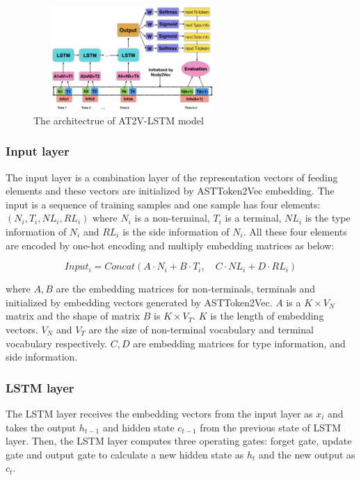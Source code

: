 \documentclass[E]{compsoft}
\begin{document}
\begin{figure}[!ht]
\centering
\includegraphics[height=4cm, width=7.5cm]{pictures/lstm_structure.png}
\caption{The architectrue of AT2V-LSTM model}
\label{fig:nti2p_model_architecture}
\end{figure}


\subsubsection{Input layer}
The input layer is a combination layer of the representation vectors of feeding elements and these vectors are initialized by ASTToken2Vec embedding.
The input is a sequence of training samples and one sample has four elements: $(N_{i}, T_{i}, NL_{i}, RL_{i})$ where $N_{i}$ is a non-terminal, $T_{i}$ is a terminal, $NL_{i}$ is the type information of $N_{i}$ and $RL_{i}$ is the side information of $N_{i}$. All these four elements are encoded by one-hot encoding and multiply embedding matrices as below:

\begin{equation}
Input_{i} = Concat(A\cdot N_{i} + B\cdot T_{i}, \quad C\cdot NL_{i} + D\cdot RL_{i})\label{equ:input}
\end{equation}

where $A, B$ are the embedding matrices for non-terminals, terminals and initialized by embedding vectors generated by ASTToken2Vec. $A$ is a $K \times V_{N} $ matrix and the shape of matrix $B$ is $K \times V_{T}$. $K$ is the length of embedding vectors. 
$V_{N}$ and $V_{T}$ are the size of non-terminal vocabulary and terminal vocabulary respectively. 
$C, D$ are embedding matrices for type information, and side information.


\subsubsection{LSTM layer}
The LSTM layer receives the embedding vectors from the input layer as $x_{i}$ and takes the output $h_{t-1}$ and hidden state $c_{t-1}$ from the previous state of LSTM layer. 
Then, the LSTM layer computes three operating gates: forget gate, update gate and output gate to calculate a new hidden state as $h_{t}$ and the new output as $c_{t}$.
\end{document}
